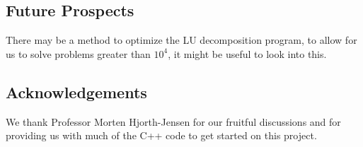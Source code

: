 \documentclass[10pt,showpacs,preprintnumbers,footinbib,amsmath,amssymb,aps,prl,twocolumn,groupedaddress,superscriptaddress,showkeys]{revtex4-1}
\begin{document}
	\subsection{Future Prospects}
	There may be a method to optimize the LU decomposition program, to allow for us to solve problems greater than $10^{4}$, it might be useful to look into this. 

        \subsection{Acknowledgements}
        We thank Professor Morten Hjorth-Jensen for our fruitful discussions and for providing us with much of the C++ code to get started on this project. 
\end{document}
